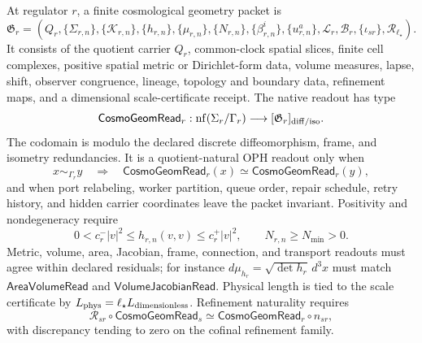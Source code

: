 \begin{definition}\label{def:finite-cosmo-geometry-packet}
At regulator \(r\), a finite cosmological geometry packet is
\[
\mathfrak G_r=
\left(
Q_r,\{\Sigma_{r,n}\},\{\mathcal K_{r,n}\},\{h_{r,n}\},\{\mu_{r,n}\},
\{N_{r,n}\},\{\beta^i_{r,n}\},\{u^a_{r,n}\},\mathcal L_r,\mathcal B_r,
\{\iota_{sr}\},\mathcal R_{\ell_\star}
\right).
\]
It consists of the quotient carrier \(Q_r\), common-clock spatial slices, finite cell complexes,
positive spatial metric or Dirichlet-form data, volume measures, lapse, shift, observer congruence,
lineage, topology and boundary data, refinement maps, and a dimensional scale-certificate receipt.
The native readout has type
\[
\mathsf{CosmoGeomRead}_r:
\operatorname{nf}(\Sigma_r/\Gamma_r)
\longrightarrow
[\mathfrak G_r]_{\rm diff/iso}.
\]
The codomain is modulo the declared discrete diffeomorphism, frame, and isometry redundancies.
It is a quotient-natural OPH readout only when
\[
x\sim_{\Gamma_r}y
\quad\Longrightarrow\quad
\mathsf{CosmoGeomRead}_r(x)\simeq\mathsf{CosmoGeomRead}_r(y),
\]
and when port relabeling, worker partition, queue order, repair schedule, retry history, and hidden
carrier coordinates leave the packet invariant.  Positivity and nondegeneracy require
\[
0<c^-_r |v|^2\le h_{r,n}(v,v)\le c^+_r |v|^2,\qquad
N_{r,n}\ge N_{\min}>0.
\]
Metric, volume, area, Jacobian, frame, connection, and transport readouts must agree within declared
residuals; for instance \(d\mu_{h_r}=\sqrt{\det h_r}\,d^3x\) must match
\(\mathsf{AreaVolumeRead}\) and \(\mathsf{VolumeJacobianRead}\).  Physical length is tied to the
scale certificate by \(L_{\rm phys}=\ell_\star L_{\rm dimensionless}\).  Refinement naturality
requires
\[
\mathcal R_{sr}\circ\mathsf{CosmoGeomRead}_s
\simeq
\mathsf{CosmoGeomRead}_r\circ n_{sr},
\]
with discrepancy tending to zero on the cofinal refinement family.
\end{definition}

